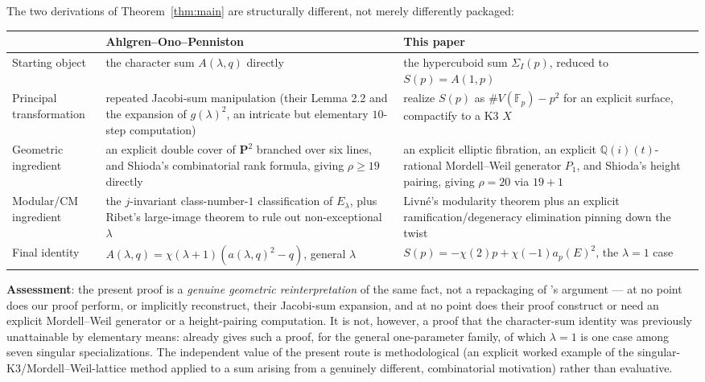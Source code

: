 \documentclass[11pt]{amsart}
\theoremstyle{definition}
\newcommand{\Fp}{\mathbb{F}_p}
\newcommand{\Q}{\mathbb{Q}}
\begin{document}
The two derivations of Theorem~\ref{thm:main} are structurally different, not merely differently packaged:

\begin{center}
\begin{tabular}{l p{5.3cm} p{5.3cm}}
& \textbf{Ahlgren--Ono--Penniston \cite{AOP2002}} & \textbf{This paper} \\\hline
Starting object & the character sum $A(\lambda,q)$ directly & the hypercuboid sum $\Sigma_I(p)$, reduced to $S(p)=A(1,p)$ \\
Principal transformation & repeated Jacobi-sum manipulation (their Lemma 2.2 and the expansion of $g(\lambda)^2$, an intricate but elementary $10$-step computation) & realize $S(p)$ as $\#V(\Fp)-p^2$ for an explicit surface, compactify to a K3 $X$ \\
Geometric ingredient & an explicit double cover of $\mathbf P^2$ branched over six lines, and Shioda's combinatorial rank formula, giving $\rho\ge19$ directly & an explicit elliptic fibration, an explicit $\Q(i)(t)$-rational Mordell--Weil generator $P_1$, and Shioda's height pairing, giving $\rho=20$ via $19+1$ \\
Modular/CM ingredient & the $j$-invariant class-number-$1$ classification of $E_\lambda$, plus Ribet's large-image theorem to rule out non-exceptional $\lambda$ & Livn\'e's modularity theorem plus an explicit ramification/degeneracy elimination pinning down the twist \\
Final identity & $A(\lambda,q)=\chi(\lambda+1)(a(\lambda,q)^2-q)$, general $\lambda$ & $S(p)=-\chi(2)p+\chi(-1)a_p(E)^2$, the $\lambda=1$ case
\end{tabular}
\end{center}

\textbf{Assessment}: the present proof is a \emph{genuine geometric reinterpretation} of the same fact, not a repackaging of \cite{AOP2002}'s argument — at no point does our proof perform, or implicitly reconstruct, their Jacobi-sum expansion, and at no point does their proof construct or need an explicit Mordell--Weil generator or a height-pairing computation. It is not, however, a proof that the character-sum identity was previously unattainable by elementary means: \cite{AOP2002} already gives such a proof, for the general one-parameter family, of which $\lambda=1$ is one case among seven singular specializations. The independent value of the present route is methodological (an explicit worked example of the singular-K3/Mordell--Weil-lattice method applied to a sum arising from a genuinely different, combinatorial motivation) rather than evaluative.
\end{document}
